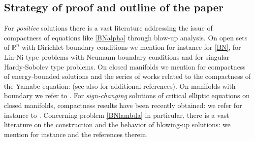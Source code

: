 \documentclass[10pt]{amsart}
\numberwithin{equation}{section}
\newcommand{\R}{\mathbb{R}}
\theoremstyle{plain}
\theoremstyle{remark}
\begin{document}
\subsection{Strategy of proof and outline of the paper}

For \emph{positive} solutions there is a vast literature addressing the issue of compactness of equations like \eqref{BNalpha}  through blow-up analysis. On open sets of $\R^n$ with Dirichlet boundary conditions we mention for instance \cite{Druetdim3, DruetLaurain,LaurainKonig, LaurainKonig2} for \eqref{BN}, \cite{druet2012lin} for Lin-Ni type problems with Neumann boundary conditions and  \cite{GhoussoubMazumdarRobert} for singular Hardy-Sobolev type problems. On closed manifolds we mention \cite{DruetJDG} for compactness of energy-bounded solutions and  the series of works related to the compactness of the Yamabe equation: \cite{LiZhu, DruetJDG, Marques, KhuMaSc} (see also \cite{HebeyZLAM} for additional references). On manifolds with boundary we refer to \cite{mesmar2024concentration}. For \emph{sign-changing} solutions of critical elliptic equations on closed manifolds, compactness results have been recently obtained: we refer for instance to \cite{PremoselliVetois, PremoselliVetois2, PremoselliVetois3, PremoselliVetois4, PremoselliRobert}.  Concerning problem \eqref{BNlambda} in particular, there is a vast literature on the construction and the behavior of blowing-up solutions:  we mention for instance \cite{BAEMP1, BAEMP2, Druetdim3, DruetLaurain, LaurainKonig, LaurainKonig2, IacopettiPacella, IacopettiVaira2, MussoPistoia2, musso2024nodal, Premoselli12, vaira2015new} and the references therein.

\medskip
\end{document}
